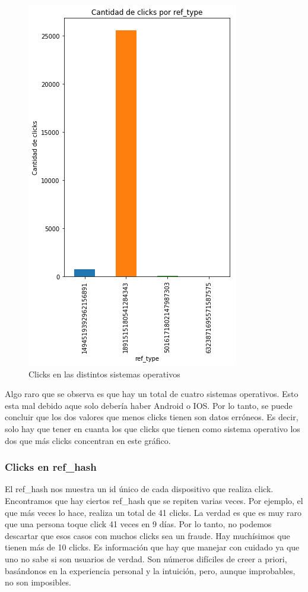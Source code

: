 \documentclass[a4paper, 12pt]{article}
\begin{document}
		\FloatBarrier
		\begin{figure}[h]
			\centering
			\includegraphics[scale = 0.6]{images/clicks/clicks_ref_type.png}
			\caption{Clicks en las distintos sistemas operativos}
		\end{figure}
		\FloatBarrier

		 Algo raro que se observa es que hay un total de cuatro sistemas operativos. Esto esta mal debido aque solo
		debería haber Android o IOS. Por lo tanto, se puede concluir que los dos valores que menos clicks tienen son datos
		erróneos. Es decir, solo hay que tener en cuanta los que clicks que tienen como sistema operativo los dos que más
		clicks concentran en este gráfico.

	\subsubsection{Clicks en ref\_hash}
		 El ref\_hash nos muestra un id único de cada dispositivo que realiza click. Encontramos que hay ciertos ref\_hash que se
		repiten varias veces. Por ejemplo, el que más veces lo hace, realiza un total de 41 clicks. La verdad es que es
		muy raro que una persona toque click 41 veces en 9 días. Por lo tanto, no podemos descartar que esos casos con
		muchos clicks sea un fraude. Hay muchísimos que tienen más de 10 clicks. Es información que hay que manejar con
		cuidado ya que uno no sabe si son usuarios de verdad. Son números difíciles de creer a priori, basándonos en la
		experiencia personal y la intuición, pero, aunque improbables, no son imposibles.
\end{document}
